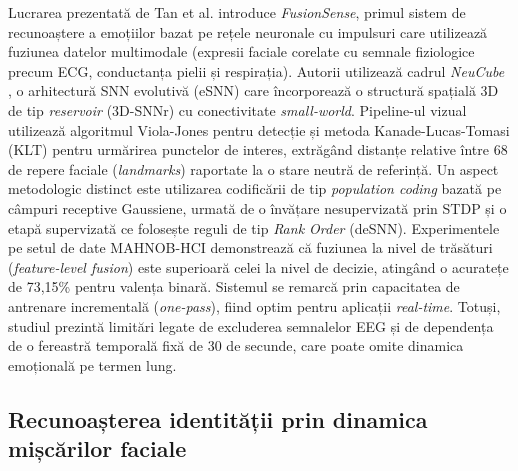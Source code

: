 Lucrarea prezentată de Tan et al. \cite{tan2020} introduce \textit{FusionSense}, primul sistem de recunoaștere a emoțiilor bazat pe rețele neuronale cu impulsuri care utilizează fuziunea datelor multimodale (expresii faciale corelate cu semnale fiziologice precum ECG, conductanța pielii și respirația). Autorii utilizează cadrul \textit{NeuCube} \cite{kasabov2014}, o arhitectură SNN evolutivă (eSNN) care încorporează o structură spațială 3D de tip \textit{reservoir} (3D-SNNr) cu conectivitate \textit{small-world}. Pipeline-ul vizual utilizează algoritmul Viola-Jones pentru detecție și metoda Kanade-Lucas-Tomasi (KLT) pentru urmărirea punctelor de interes, extrăgând distanțe relative între 68 de repere faciale (\textit{landmarks}) raportate la o stare neutră de referință. Un aspect metodologic distinct este utilizarea codificării de tip \textit{population coding} bazată pe câmpuri receptive Gaussiene, urmată de o învățare nesupervizată prin STDP și o etapă supervizată ce folosește reguli de tip \textit{Rank Order} (deSNN). Experimentele pe setul de date MAHNOB-HCI demonstrează că fuziunea la nivel de trăsături (\textit{feature-level fusion}) este superioară celei la nivel de decizie, atingând o acuratețe de 73,15\% pentru valența binară. Sistemul se remarcă prin capacitatea de antrenare incrementală (\textit{one-pass}), fiind optim pentru aplicații \textit{real-time}. Totuși, studiul prezintă limitări legate de excluderea semnalelor EEG și de dependența de o fereastră temporală fixă de 30 de secunde, care poate omite dinamica emoțională pe termen lung.

\subsection*{Recunoașterea identității prin dinamica mișcărilor faciale}

